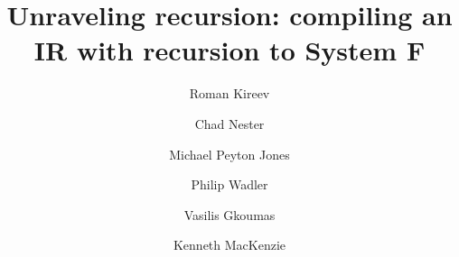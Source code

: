 

\title{Unraveling recursion: compiling an IR with recursion to System F}

\author{
 Roman Kireev
\and Chad Nester
\and Michael Peyton Jones
\and Philip Wadler
\and Vasilis Gkoumas
\and Kenneth MacKenzie
}



\usepackage[T1]{fontenc}
\usepackage[utf8]{inputenc}

\usepackage{amsmath}
\usepackage{amssymb}

\usepackage{verbatim}

\usepackage{etoolbox}

\usepackage{todonotes}

\usepackage{semantic}

\usepackage{mathpartir}

\usepackage{hyperref}
\usepackage[capitalise, noabbrev]{cleveref}

\newtoggle{lagda}
\togglefalse{lagda}

